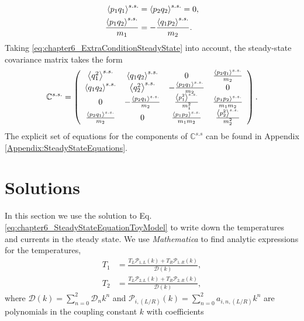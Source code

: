 %
\begin{align}
  \expval{ p_1 q_1}^{s.s.} &= \expval{ p_2 q_2}^{s.s.} = 0,\nonumber\\
  \frac{\expval{ p_1 q_2}^{s.s.}}{m_1}&=-\frac{\expval{ q_1 p_2}^{s.s.}}{m_2}.
  \label{eq:chapter6_ExtraConditionSteadyState}
\end{align}
%
Taking \eqref{eq:chapter6_ExtraConditionSteadyState} into account, the steady-state covariance matrix takes the form
%
\begin{equation}
  \begin{split}
    \mathbb{C}^{s.s.} =
    \left(
    \begin{array}{cccc}
      \expval{ q_1^2}^{s.s.}  & \expval{ q_1 q_2}^{s.s.}  & 0 & \frac{\expval{ p_2 q_1}^{s.s.} }{m_2} \\
      \expval{ q_1 q_2}^{s.s.}  & \expval{ q_2^2}^{s.s.}  & -\frac{\expval{ p_2 q_1}^{s.s.} }{m_2} & 0 \\
      0 & -\frac{\expval{ p_2 q_1}^{s.s.} }{m_2} & \frac{\expval{ p_1^2}^{s.s.} }{m_1^2} & \frac{\expval{ p_1 p_2}^{s.s.} }{m_1 m_2} \\
      \frac{\expval{ p_2 q_1}^{s.s.} }{m_2} & 0 & \frac{\expval{ p_1 p_2}^{s.s.} }{m_1 m_2} & \frac{\expval{ p_2^2}^{s.s.} }{m_2^2} \\
      \end{array}
      \right)
    \end{split}
    \label{eq:chapter6_steadyStateCovarianceMatrix}\,.
\end{equation}
%
The explicit set of equations for the components of $\mathbb{C}^{s.s}$ can be found in Appendix \ref{Appendix:SteadyStateEquations}.
%
%
%
%
%
\section{Solutions\label{sec:solutions}}
%
%
%
%

%
In this section we use the solution to Eq. \eqref{eq:chapter6_SteadyStateEquationToyModel} to write down the temperatures and currents in the steady state. We use {\it Mathematica} to find analytic expressions for the temperatures,
%
\begin{align}
  T_1 &= \frac{T_L \mathcal{P}_{1,L}(k) + T_R \mathcal{P}_{1,R}(k)}{\mathcal{D}(k)},\nonumber
  \\
  T_2 &= \frac{T_L \mathcal{P}_{2,L}(k) + T_R \mathcal{P}_{2,R}(k)}{\mathcal{D}(k)},
  \label{eq:chapter6_ModelBTemperatures}
\end{align}
%
where $\mathcal{D}(k) =  \sum\limits_{n=0}^2 \mathcal{D}_n k^n$ and $\mathcal{P}_{i,(L/R)}(k) = \sum\limits_{n=0}^2 a_{i,n,(L/R)} k^n$ are polynomials in the coupling constant $k$ with coefficients
%

